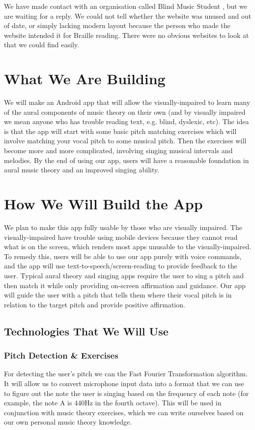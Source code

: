 \documentclass{article}
\begin{document}
We have made contact with an organisation called Blind Music Student \cite{blindmusicstudent}, but we are waiting for a reply. We could not tell whether the website was unused and out of date, or simply lacking modern layout because the person who made the website intended it for Braille reading. There were no obvious websites to look at that we could find easily.

\section{What We Are Building}
We will make an Android app that will allow the visually-impaired to learn many of the aural components of music theory on their own (and by visually impaired we mean anyone who has trouble reading text, e.g. blind, dyslexic, etc). The idea is that the app will start with some basic pitch matching exercises which will involve matching your vocal pitch to some musical pitch. Then the exercises will become more and more complicated, involving singing musical intervals and melodies. By the end of using our app, users will have a reasonable foundation in aural music theory and an improved singing ability. 


\section{How We Will Build the App}
We plan to make this app fully usable by those who are visually impaired. The visually-impaired have trouble using mobile devices because they cannot read what is on the screen, which renders most apps unusable to the visually-impaired. To remedy this, users will be able to use our app purely with voice commands, and the app will use text-to-speech/screen-reading to provide feedback to the user. Typical aural theory and singing apps require the user to sing a pitch and then match it while only providing on-screen affirmation and guidance. Our app will guide the user with a pitch that tells them where their vocal pitch is in relation to the target pitch and provide positive affirmation.

\subsection{Technologies That We Will Use}
\subsubsection{Pitch Detection \& Exercises}
For detecting the user's pitch we can the Fast Fourier Transformation algorithm. It will allow us to convert microphone input data into a format that we can use to figure out the note the user is singing based on the frequency of each note (for example, the note A is 440Hz in the fourth octave). This will be used in conjunction with music theory exercises, which we can write ourselves based on our own personal music theory knowledge. 
\end{document}
